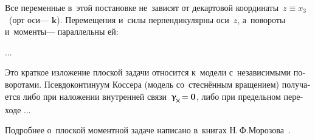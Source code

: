 

\label{para:planedeformation.cosseratcontinuum}

\begin{otherlanguage}{russian}

Все переменные в~этой постановке не~зависят от декартовой координаты~${z \equiv x_3}$~(орт оси\:--- $\bm{k}$). Перемещения и~силы перпендикулярны оси~$z$, а~повороты и~моменты\:--- параллельны ей:

...


Это краткое изложение плоской задачи относится к~модели с~независимыми поворотами. Псевдоконтинуум Коссера (модель со~стеснённым вращением) получается либо при наложении внутренней связи~${\distortiontensor_{\hspace{-0.25ex}\Xcompanion} \hspace{-0.32ex} = \bm{0}}$, либо при предельном переходе ...

Подробнее о~плоской моментной задаче написано в~книгах Н.\,Ф.\;Морозова~\cite{morozov-twodimensionalproblems, morozov-fractures}.

\end{otherlanguage}



\label{para:nonlinear.micropolar}

